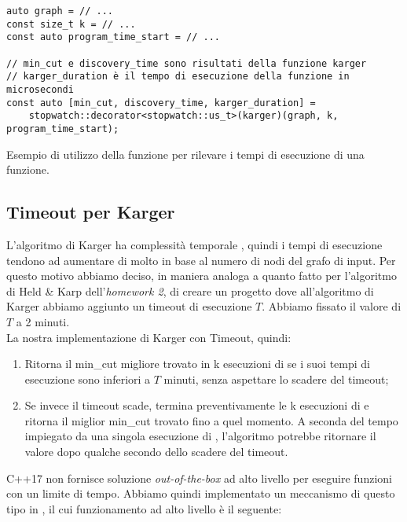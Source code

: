 \begin{listing}[!ht]
\begin{verbatim}
auto graph = // ...
const size_t k = // ...
const auto program_time_start = // ...

// min_cut e discovery_time sono risultati della funzione karger
// karger_duration è il tempo di esecuzione della funzione in microsecondi
const auto [min_cut, discovery_time, karger_duration] =
    stopwatch::decorator<stopwatch::us_t>(karger)(graph, k, program_time_start);

\end{verbatim}
\caption{Esempio di utilizzo della funzione  per
  rilevare i tempi di esecuzione di una funzione.}
\label{listings:stopwatch-decorator-usage}
\end{listing}

\subsection{Timeout per Karger}

\noindent L'algoritmo di Karger ha complessità temporale
\complexityKargerTime{}, quindi i tempi di esecuzione tendono ad
aumentare di molto in base al numero di nodi del grafo di input. Per
questo motivo abbiamo deciso, in maniera analoga a quanto fatto per
l'algoritmo di Held \& Karp dell'\emph{homework 2}, di creare un progetto
dove all'algoritmo di Karger abbiamo aggiunto un timeout di esecuzione
$T$. Abbiamo fissato il valore di $T$ a 2 minuti.\\

\noindent La nostra implementazione di Karger con Timeout, quindi:

\begin{enumerate}
    \item Ritorna il min\_cut migliore trovato in k esecuzioni di
       se i suoi tempi di esecuzione
      sono inferiori a $T$ minuti, senza aspettare lo scadere del
      timeout;
    \item Se invece il timeout scade, termina preventivamente le k
      esecuzioni di  e ritorna il
      miglior min\_cut trovato fino a quel momento. A seconda del
      tempo impiegato da una singola esecuzione di
      , l'algoritmo potrebbe ritornare
      il valore dopo qualche secondo dello scadere del timeout.
\end{enumerate}

\noindent C++17 non fornisce soluzione \textit{out-of-the-box} ad alto
livello per eseguire funzioni con un limite di tempo. Abbiamo quindi
implementato un meccanismo di questo tipo in
, il cui funzionamento ad alto livello è
il seguente:

